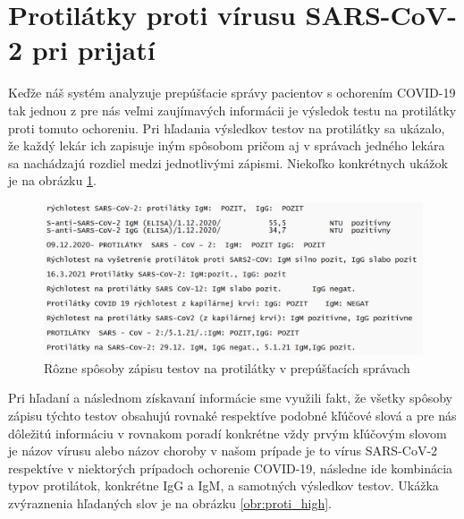 \section{Protilátky proti vírusu SARS-CoV-2 pri prijatí}
\label{protilatky}

Keďže náš systém analyzuje prepúšťacie správy pacientov s ochorením COVID-19 tak jednou z pre nás veľmi zaujímavých informácii je výsledok testu na protilátky proti tomuto ochoreniu. Pri hľadania výsledkov testov na protilátky sa ukázalo, že každý lekár ich zapisuje iným spôsobom pričom aj v správach jedného lekára sa nachádzajú rozdiel medzi jednotlivými zápismi. Niekoľko konkrétnych ukážok je na obrázku \ref{obr:proti}. 

\begin{figure}
	\centerline{\includegraphics[width=1\textwidth]{images/protilatky}}
	\caption[Protilátky]{Rôzne spôsoby zápisu testov na protilátky v prepúšťacích správach}
	\label{obr:proti}
\end{figure}

Pri hľadaní a následnom získavaní informácie sme využili fakt, že všetky spôsoby zápisu týchto testov obsahujú rovnaké respektíve podobné kľúčové slová a pre nás dôležitú informáciu v rovnakom poradí konkrétne vždy prvým kľúčovým slovom je názov vírusu alebo názov choroby v našom prípade je to vírus SARS-CoV-2 respektíve v niektorých prípadoch ochorenie COVID-19, následne ide kombinácia typov protilátok, konkrétne IgG a IgM, a samotných výsledkov testov. Ukážka zvýraznenia hľadaných slov je na obrázku \ref{obr:proti_high}.

